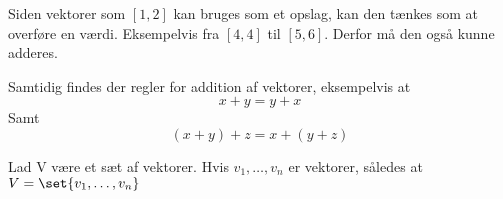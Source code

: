 Siden vektorer som $[1,2]$ kan bruges som et opslag, kan den tænkes som at overføre en værdi. Eksempelvis fra $[4,4]$ til $[5,6]$. Derfor må den også kunne adderes.

Samtidig findes der regler for addition af vektorer, eksempelvis at
\begin{equation}
	x+y=y+x
\end{equation}
Samt
\begin{equation}
	(x+y)+z=x+(y+z)
\end{equation}



\begin{frdef}
	Lad V være et sæt af vektorer. Hvis $v_1,\dots,v_n$ er vektorer, således at $V=\set{v_1,\dots,v_n}$
\end{frdef}